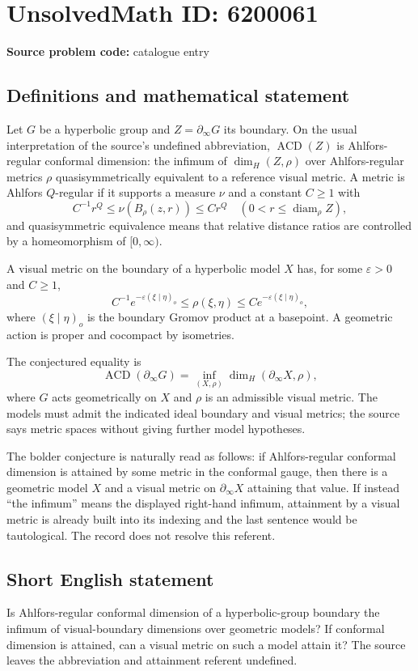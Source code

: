 \documentclass[11pt]{article}
\begin{document}
\section*{UnsolvedMath ID: 6200061}
\textbf{Source problem code:} catalogue entry
\subsection{Definitions and mathematical statement}
Let $G$ be a hyperbolic group and $Z=\partial_\infty G$ its boundary. On the usual interpretation of the source's undefined abbreviation, $\operatorname{ACD}(Z)$ is Ahlfors-regular conformal dimension: the infimum of $\dim_H(Z,\rho)$ over Ahlfors-regular metrics $\rho$ quasisymmetrically equivalent to a reference visual metric. A metric is Ahlfors $Q$-regular if it supports a measure $\nu$ and a constant $C\geq1$ with
\[
C^{-1}r^Q\leq\nu(B_\rho(z,r))\leq Cr^Q
\quad(0<r\leq\operatorname{diam}_\rho Z),
\]
and quasisymmetric equivalence means that relative distance ratios are controlled by a homeomorphism of $[0,\infty)$.

A visual metric on the boundary of a hyperbolic model $X$ has, for some $\varepsilon>0$ and $C\geq1$,
\[
C^{-1}e^{-\varepsilon(\xi\mid\eta)_o}\leq\rho(\xi,\eta)\leq C e^{-\varepsilon(\xi\mid\eta)_o},
\]
where $(\xi\mid\eta)_o$ is the boundary Gromov product at a basepoint. A geometric action is proper and cocompact by isometries.

The conjectured equality is
\[
\operatorname{ACD}(\partial_\infty G)
=\inf_{(X,\rho)}\dim_H(\partial_\infty X,\rho),
\]
where $G$ acts geometrically on $X$ and $\rho$ is an admissible visual metric. The models must admit the indicated ideal boundary and visual metrics; the source says metric spaces without giving further model hypotheses.

The bolder conjecture is naturally read as follows: if Ahlfors-regular conformal dimension is attained by some metric in the conformal gauge, then there is a geometric model $X$ and a visual metric on $\partial_\infty X$ attaining that value. If instead ``the infimum'' means the displayed right-hand infimum, attainment by a visual metric is already built into its indexing and the last sentence would be tautological. The record does not resolve this referent.
\subsection{Short English statement}
Is Ahlfors-regular conformal dimension of a hyperbolic-group boundary the infimum of visual-boundary dimensions over geometric models? If conformal dimension is attained, can a visual metric on such a model attain it? The source leaves the abbreviation and attainment referent undefined.
\end{document}
